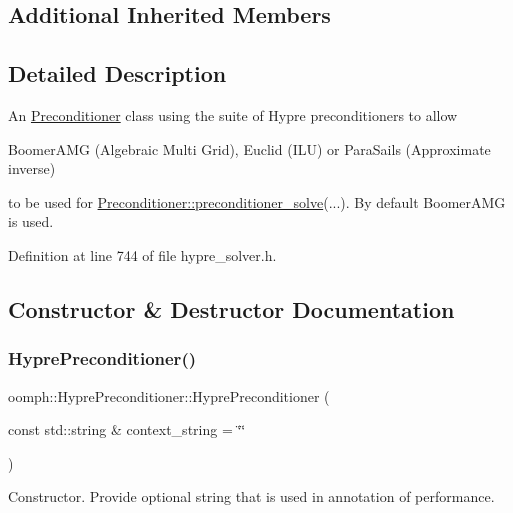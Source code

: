 \subsection*{Additional Inherited Members}


\subsection{Detailed Description}
An \hyperlink{classoomph_1_1Preconditioner}{Preconditioner} class using the suite of Hypre preconditioners to allow \begin{DoxyVerb} BoomerAMG (Algebraic Multi Grid),
 Euclid (ILU) or 
 ParaSails (Approximate inverse) 
\end{DoxyVerb}


to be used for \hyperlink{classoomph_1_1Preconditioner_ace1199369e4465cd2b9a34884bb64ec8}{Preconditioner\+::preconditioner\+\_\+solve}(...). By default Boomer\+A\+MG is used. 

Definition at line 744 of file hypre\+\_\+solver.\+h.



\subsection{Constructor \& Destructor Documentation}
\mbox{\label{classoomph_1_1HyprePreconditioner_af65f23a658889324894e331af515a71c}} 
\subsubsection{\texorpdfstring{Hypre\+Preconditioner()}{HyprePreconditioner()}\hspace{0.1cm}{\footnotesize\ttfamily [1/2]}}
{\footnotesize\ttfamily oomph\+::\+Hypre\+Preconditioner\+::\+Hypre\+Preconditioner (\begin{DoxyParamCaption}\item[{const std\+::string \&}]{context\+\_\+string = {\ttfamily \char`\"{}\char`\"{}} }\end{DoxyParamCaption})\hspace{0.3cm}{\ttfamily [inline]}}



Constructor. Provide optional string that is used in annotation of performance. 



